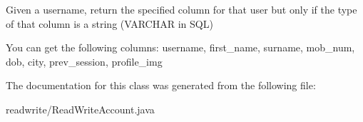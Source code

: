 Given a username, return the specified column for that user but only if the type of that column is a string (V\+A\+R\+C\+H\+AR in S\+QL) 

You can get the following columns\+: username, first\+\_\+name, surname, mob\+\_\+num, dob, city, prev\+\_\+session, profile\+\_\+img 

The documentation for this class was generated from the following file\+:\begin{DoxyCompactItemize}
\item 
readwrite/Read\+Write\+Account.\+java\end{DoxyCompactItemize}
